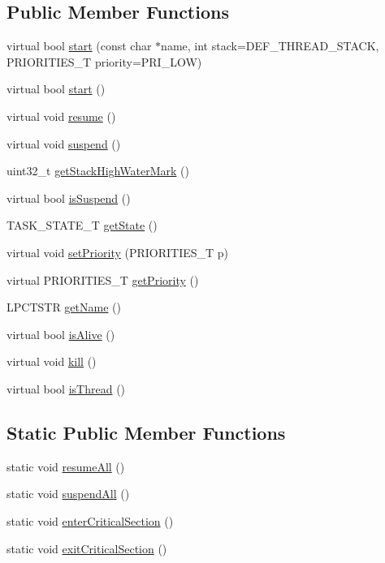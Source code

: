 \subsection*{Public Member Functions}
\begin{DoxyCompactItemize}
\item 
virtual bool \hyperlink{class_c_thread_a3ebabcc071634508511ae2fc7b868ab7}{start} (const char $\ast$name, int stack=D\-E\-F\-\_\-\-T\-H\-R\-E\-A\-D\-\_\-\-S\-T\-A\-C\-K, P\-R\-I\-O\-R\-I\-T\-I\-E\-S\-\_\-\-T priority=P\-R\-I\-\_\-\-L\-O\-W)
\item 
virtual bool \hyperlink{class_c_thread_aacf955d1852e74da1f989251955ee6ec}{start} ()
\item 
virtual void \hyperlink{class_c_thread_ac8c53aa8c145fc4ac70fa6d825b95742}{resume} ()
\item 
virtual void \hyperlink{class_c_thread_a53e71e6db2221cd1c45aec21953d4aad}{suspend} ()
\item 
uint32\-\_\-t \hyperlink{class_c_thread_ac0227eda51725b795a461a768703f588}{get\-Stack\-High\-Water\-Mark} ()
\item 
virtual bool \hyperlink{class_c_thread_a51dbe9909ce528b4113d2cc27314e965}{is\-Suspend} ()
\item 
T\-A\-S\-K\-\_\-\-S\-T\-A\-T\-E\-\_\-\-T \hyperlink{class_c_thread_a1e9cce461d8dfb3889cea24f1a703f6f}{get\-State} ()
\item 
virtual void \hyperlink{class_c_thread_a6b0703ae0cc085a0c0aaa55b6945575b}{set\-Priority} (P\-R\-I\-O\-R\-I\-T\-I\-E\-S\-\_\-\-T p)
\item 
virtual P\-R\-I\-O\-R\-I\-T\-I\-E\-S\-\_\-\-T \hyperlink{class_c_thread_ac30b0a1f51549a97b88771692319c0e4}{get\-Priority} ()
\item 
L\-P\-C\-T\-S\-T\-R \hyperlink{class_c_thread_aa291909bc3ff7cc0decf46c885a7a725}{get\-Name} ()
\item 
virtual bool \hyperlink{class_c_thread_a4a0f0727be4714cef1e24150a869d403}{is\-Alive} ()
\item 
virtual void \hyperlink{class_c_thread_a15041136818470124d097d790d55a6e5}{kill} ()
\item 
virtual bool \hyperlink{class_c_thread_ab2513fd0fcad30e2e6605609c91f1984}{is\-Thread} ()
\end{DoxyCompactItemize}
\subsection*{Static Public Member Functions}
\begin{DoxyCompactItemize}
\item 
static void \hyperlink{class_c_thread_a743d4325b7e7da494283f3292773ff77}{resume\-All} ()
\item 
static void \hyperlink{class_c_thread_a2c09328581bd4e4a3e9e793f3376a92a}{suspend\-All} ()
\item 
static void \hyperlink{class_c_thread_aeb4cafe42d6cfc41294cf5dedcee8678}{enter\-Critical\-Section} ()
\item 
static void \hyperlink{class_c_thread_aab3a51062666552690be49b8e8027161}{exit\-Critical\-Section} ()
\end{DoxyCompactItemize}
